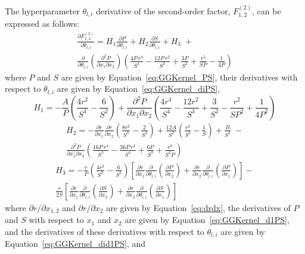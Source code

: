 \documentclass{article}
\begin{document}
The hyperparameter $\theta_{l,i}$ derivative of the second-order factor, $F^{\left(2\right)}_{1,2}$, can be expressed as follows:
\begin{multline}
\label{eq:GGKernel_diF2}
	\frac{\partial F^{\left(2\right)}_{1,2}}{\partial \theta_{l,i}} = H_1 \frac{\partial P}{\partial \theta_{l,i}} + H_2 \frac{\partial S}{\partial \theta_{l,i}} + H_3 \; + \\
	\frac{\partial}{\partial \theta_{l,i}}\!\left(\frac{\partial^2 P}{\partial x_1 \partial x_2}\right) \left(\frac{4P \, r^4}{S^4} - \frac{12P \, r^2}{S^3} + \frac{3P}{S^2} + \frac{r^2}{SP} - \frac{1}{4P}\right)
\end{multline}
where $P$ and $S$ are given by Equation~\eqref{eq:GGKernel_PS}, their derivatives with respect to $\theta_{l,i}$ are given by Equation~\eqref{eq:GGKernel_diPS},
\begin{equation}
\label{eq:GGKernel_di_H1}
	H_1 = -\frac{A}{P} \left(\frac{4r^2}{S^3} - \frac{6}{S^2}\right) + \frac{\partial^2 P}{\partial x_1 \partial x_2} \left(\frac{4r^4}{S^4} - \frac{12r^2}{S^3} + \frac{3}{S^2} - \frac{r^2}{SP^2} + \frac{1}{4P^2}\right)
\end{equation}
\begin{multline}
\label{eq:GGKernel_di_H2}
	H_2 = -\frac{\partial r}{\partial x_1} \frac{\partial r}{\partial x_2} \left(\frac{8r^2}{S^3} - \frac{2}{S^2}\right) + \frac{12A}{S^2} \left(\frac{r^2}{S^2} - \frac{1}{S}\right) + \frac{B}{S^2} \; -\\
	\frac{\partial^2 P}{\partial x_1 \partial x_2} \left(\frac{16P \, r^4}{S^5} - \frac{36P \, r^2}{S^4} + \frac{6P}{S^3} + \frac{r^2}{S^2 P}\right)
\end{multline}
\begin{multline}
\label{eq:GGKernel_di_H3}
	H_3 = -\frac{r}{P} \left(\frac{4r^2}{S^3} - \frac{6}{S^2}\right) \left[\frac{\partial r}{\partial x_1} \frac{\partial}{\partial \theta_{l,i}}\!\left(\frac{\partial P}{\partial x_2}\right) + \frac{\partial r}{\partial x_2} \frac{\partial}{\partial \theta_{l,i}}\!\left(\frac{\partial P}{\partial x_1}\right)\right] -\\
	\frac{r}{2S} \left[\frac{\partial r}{\partial x_1} \frac{\partial}{\partial \theta_{l,i}}\!\left(\frac{\partial S}{\partial x_2}\right) + \frac{\partial r}{\partial x_2} \frac{\partial}{\partial \theta_{l,i}}\!\left(\frac{\partial S}{\partial x_1}\right)\right]
\end{multline}
where $\partial r/\partial x_{1,2}$ and $\partial r/\partial x_2$ are given by Equation~\eqref{eq:drdx}, the derivatives of $P$ and $S$ with respect to $x_1$ and $x_2$ are given by Equation~\eqref{eq:GGKernel_d1PS}, and the derivatives of these derivatives with respect to $\theta_{l,i}$ are given by Equation~\eqref{eq:GGKernel_did1PS}, and
\end{document}
